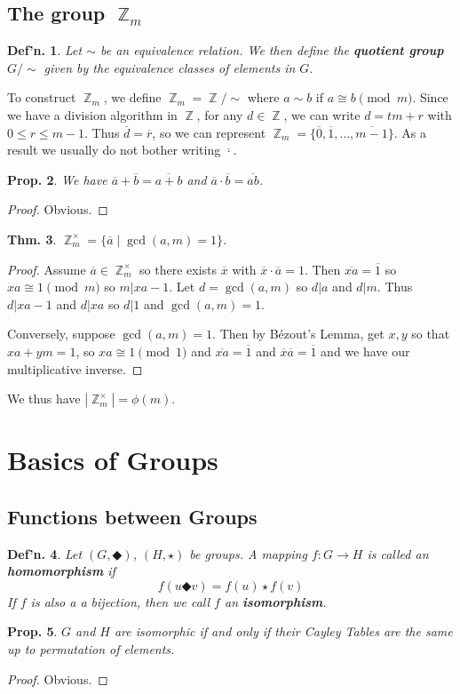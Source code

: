 \documentclass[12pt, a4paper]{book}
\DeclareMathOperator{\Z}{\mathbb{Z}}
\newtheorem{theorem}{Thm.}[section]
\newtheorem{definition}[theorem]{Def'n.}
\newtheorem{proposition}[theorem]{Prop.}
\theoremstyle{nonumberplain}
\newtheorem{proof}{Proof}
\begin{document}
\subsection{The group $\Z_m$}
\begin{definition}
    Let $\sim$ be an equivalence relation.
    We then define the \textbf{quotient group} $G/\sim$ given by the equivalence classes of elements in $G$.
\end{definition}
To construct $\Z_m$, we define $\Z_m=\Z/\sim$ where $a\sim b$ if $a\cong b\pmod{m}$.
Since we have a division algorithm in $\Z$, for any $d\in\Z$, we can write $d=tm+r$ with $0\leq r\leq m-1$.
Thus $\overline{d}=\overline{r}$, so we can represent $\Z_m=\{\overline{0},\overline{1},\ldots,\overline{m-1}\}$.
As a result we usually do not bother writing $\overline{\cdot}$.
\begin{proposition}
    We have $\overline{a}+\overline{b}=\overline{a+b}$ and $\overline{a}\cdot\overline{b}=\overline{ab}$.
\end{proposition}
\begin{proof}
    Obvious.
\end{proof}
\begin{theorem}
    $\Z_m^\times=\{\overline{a}\mid\gcd(a,m)=1\}$.
\end{theorem}
\begin{proof}
    Assume $\overline{a}\in\Z^\times_m$ so there exists $\overline{x}$ with $\overline{x}\cdot\overline{a}=1$.
    Then $\overline{xa}=\overline{1}$ so $xa\cong 1\pmod{m}$ so $m|xa-1$.
    Let $d=\gcd(a,m)$ so $d|a$ and $d|m$.
    Thus $d|xa-1$ and $d|xa$ so $d|1$ and $\gcd(a,m)=1$.

    Conversely, suppose $\gcd(a,m)=1$.
    Then by B\'ezout's Lemma, get $x,y$ so that $xa+ym=1$, so $xa\cong 1\pmod{1}$ and $\overline{xa}=\overline{1}$ and $\overline{x}\overline{a}=\overline{1}$ and we have our multiplicative inverse.
\end{proof}
We thus have $|\Z_m^\times|=\phi(m)$.
\section{Basics of Groups}
\subsection{Functions between Groups}
\begin{definition}
    Let $(G,\Diamondblack)$, $(H,\star)$ be groups.
    A mapping $f:G\to H$ is called an \textbf{homomorphism} if
    \[f(u\Diamondblack v)=f(u)\star f(v)\]
    If $f$ is also a a bijection, then we call $f$ an \textbf{isomorphism}.
\end{definition}
\begin{proposition}
    $G$ and $H$ are isomorphic if and only if their Cayley Tables are the same up to permutation of elements.
\end{proposition}
\begin{proof}
    Obvious.
\end{proof}
\end{document}
